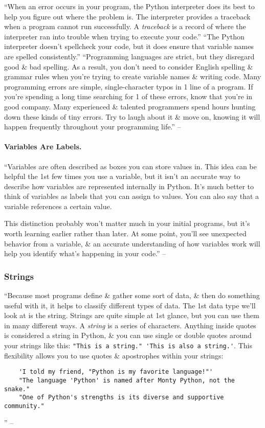 \documentclass[oneside]{book}
\numberwithin{equation}{section}
\begin{document}
``When an error occurs in your program, the Python interpreter does its best to help you figure out where the problem is. The interpreter provides a traceback when a program cannot run successfully. A \textit{traceback} is a record of where the interpreter ran into trouble when trying to execute your code.'' ``The Python interpreter doesn't spellcheck your code, but it does ensure that variable names are spelled consistently.'' ``Programming languages are strict, but they disregard good \& bad spelling. As a result, you don't need to consider English spelling \& grammar rules when you're trying to create variable names \& writing code. Many programming errors are simple, single-character typos in 1 line of a program. If you're spending a long time searching for 1 of these errors, know that you're in good company. Many experienced \& talented programmers spend hours hunting down these kinds of tiny errors. Try to laugh about it \& move on, knowing it will happen frequently throughout your programming life.'' -- \cite[p. 18]{Matthes2019}

\paragraph{Variables Are Labels.} ``Variables are often described as boxes you can store values in. This idea can be helpful the 1st few times you use a variable, but it isn't an accurate way to describe how variables are represented internally in Python. It's much better to think of variables as labels that you can assign to values. You can also say that a variable references a certain value.

This distinction probably won't matter much in your initial programs, but it's worth learning earlier rather than later. At some point, you'll see unexpected behavior from a variable, \& an accurate understanding of how variables work will help you identify what's happening in your code.'' -- \cite[pp. 18--19]{Matthes2019}

\subsubsection{Strings}
``Because most programs define \& gather some sort of data, \& then do something useful with it, it helps to classify different types of data. The 1st data type we'll look at is the string. Strings are quite simple at 1st glance, but you can use them in many different ways. A \textit{string} is a series of characters. Anything inside quotes is considered a string in Python, \& you can use single or double quotes around your strings like this: \verb|"This is a string." 'This is also a string.'|. This flexibility allows you to use quotes \& apostrophes within your strings:
\begin{verbatim}
	'I told my friend, "Python is my favorite language!"'
	"The language 'Python' is named after Monty Python, not the snake."
	"One of Python's strengths is its diverse and supportive community."
\end{verbatim}
'' -- \cite[p. 19]{Matthes2019}
\end{document}
